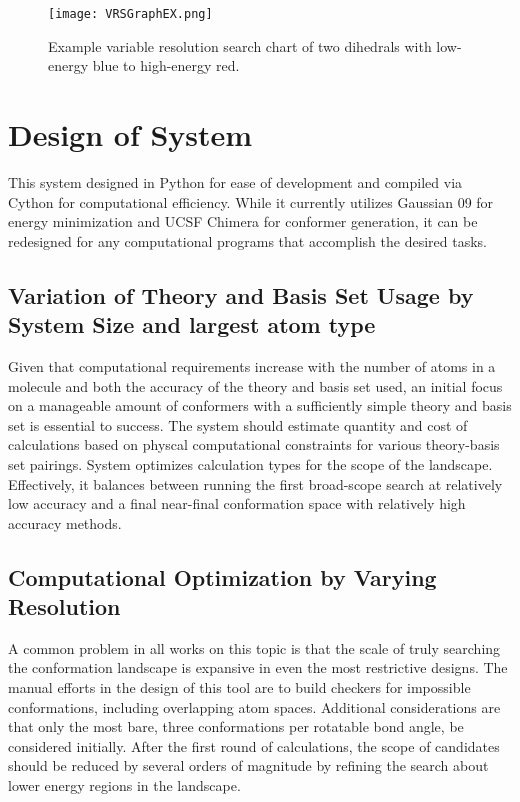 \begin{figure}
	
	\centering
	
	\texttt{[image: VRSGraphEX.png]}
	
	\caption{Example variable resolution search chart of two dihedrals with low-energy blue to high-energy red.}
	
	\label{fig:variableResolutionSample}
		
\end{figure}

\section{Design of System}

This system designed in Python for ease of development and compiled via Cython for computational efficiency. 
While it currently utilizes Gaussian 09 for energy minimization and UCSF Chimera for conformer generation, it can be redesigned for any computational programs that accomplish the desired tasks.

\subsection{Variation of Theory and Basis Set Usage by System Size and largest atom type}

Given that computational requirements increase with the number of atoms in a molecule and both the accuracy of the theory and basis set used, an initial focus on a manageable amount of conformers with a sufficiently simple theory and basis set is essential to success.
The system should estimate quantity and cost of calculations based on physcal computational constraints for various theory-basis set pairings. 
System optimizes calculation types for the scope of the landscape.
Effectively, it balances between running the first broad-scope search at relatively low accuracy and a final near-final conformation space with relatively high accuracy methods.


\subsection{Computational Optimization by Varying Resolution}

A common problem in all works on this topic is that the scale of truly searching the conformation landscape is expansive in even the most restrictive designs. 
The manual efforts in the design of this tool are to build checkers for impossible conformations, including overlapping atom spaces.
Additional considerations are that only the most bare, three conformations per rotatable bond angle, be considered initially.
After the first round of calculations, the scope of candidates should be reduced by several orders of magnitude by refining the search about lower energy regions in the landscape.


